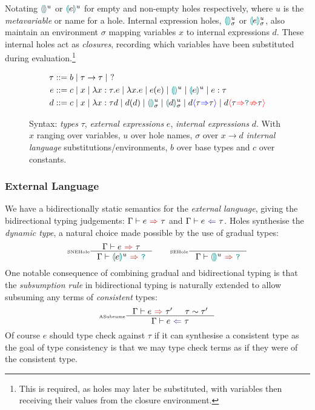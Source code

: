 Notating $\hole{}^u$ or $\hole[e]^u$ for empty and non-empty holes respectively, where $u$ is the \textit{metavariable} or name for a hole. Internal expression holes, $\hole{}^u_\sigma$ or $\hole[e]^u_\sigma$, also maintain an environment $\sigma$ mapping variables $x$ to internal expressions $d$. These internal holes act as \textit{closures}, recording which variables have been substituted during evaluation.\footnote{This is required, as holes may later be substituted, with variables then receiving their values from the closure environment.}
\begin{figure}[h]
\begin{align*}
\tau &::= b \mid \tau \to \tau \mid\  ?\\
e &::= c \mid x \mid \lambda x : \tau.e \mid \lambda x. e \mid e(e) \mid \hole^u \mid \hole[e]^u \mid e : \tau\\
d &::= c \mid x \mid \lambda x : \tau d \mid d(d) \mid \hole^u_\sigma \mid \hole[d]^u_\sigma \mid d\scast{\tau}{\tau} \mid d\scasterror{\tau}{\tau}
\end{align*}
\caption{Syntax: \textit{types} $\tau$, \textit{external expressions} $e$, \textit{internal expressions} $d$. With $x$ ranging over variables, $u$ over hole names, $\sigma$ over $x \to d$ \textit{internal language} substitutions/environments, $b$ over base types and $c$ over constants.}
\label{fig:syntax}
\end{figure}

\subsubsection{External Language}\label{sec:HazelExternalLang}
We have a bidirectionally static semantics for the \textit{external language}, giving the bidirectional typing judgements: $\synthesis{e}{\tau}$ and $\analysis{e}{\tau}$. Holes synthesise the \textit{dynamic type}, a natural choice made possible by the use of gradual types:
\[\inference[\tiny SNEHole]{\synthesis{e}{\tau}}{\synthesis{\hole[e]^u}{\dyn}} \qquad \inference[\tiny SEHole]{}{\synthesis{\hole^u}{\dyn}}\] 
One notable consequence of combining gradual and bidirectional typing is that the \textit{subsumption rule} in bidirectional typing is naturally extended to allow subsuming any terms of \textit{consistent} types:
\[\inference[\tiny ASubsume]{\synthesis{e}{\tau'}& \tau \sim \tau'}{\analysis{e}{\tau}}\]
Of course $e$ should type check against $\tau$ if it can synthesise a consistent type as the goal of type consistency is that we may type check terms as if they were of the consistent type.

